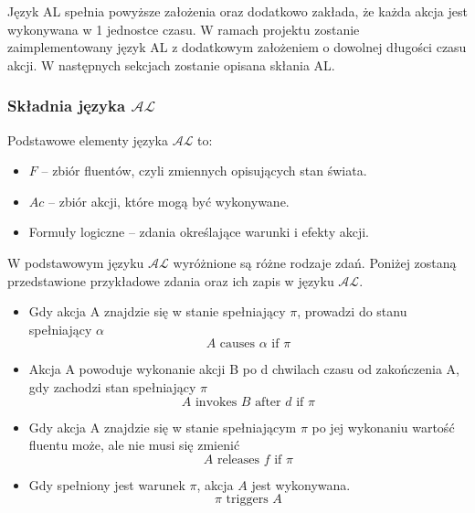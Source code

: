 \documentclass{article}
\begin{document}
Język AL spełnia powyższe założenia oraz dodatkowo zakłada, że każda akcja jest wykonywana w 1 jednostce czasu. W ramach projektu zostanie zaimplementowany język AL z dodatkowym założeniem o dowolnej długości czasu akcji. W następnych sekcjach zostanie opisana skłania AL.

\subsubsection{Składnia języka $\mathcal{AL}$}

Podstawowe elementy języka $\mathcal{AL}$ to:
\begin{itemize}
    \item $F$ – zbiór fluentów, czyli zmiennych opisujących stan świata.
    \item $Ac$ – zbiór akcji, które mogą być wykonywane.
    \item Formuły logiczne – zdania określające warunki i efekty akcji.
\end{itemize}

\noindent W podstawowym języku $\mathcal{AL}$ wyróżnione są różne rodzaje zdań. Poniżej zostaną przedstawione przykładowe zdania oraz ich zapis w języku $\mathcal{AL}$.
\begin{itemize}
    \item Gdy akcja A znajdzie się w stanie spełniający $\pi$, prowadzi do stanu spełniający $\alpha$
    \begin{equation}
     A \text{ causes } \alpha \text{ if } \pi
    \end{equation}

    \item Akcja A powoduje wykonanie akcji B po d chwilach czasu od zakończenia A, gdy zachodzi stan spełniający $\pi$
    \begin{equation}
        A \text{ invokes } B \text{ after } d \text{ if } \pi
    \end{equation}

    \item Gdy akcja A znajdzie się w stanie spełniającym $\pi$ po jej wykonaniu wartość fluentu może, ale nie musi się zmienić
    \begin{equation}
        A \text{ releases } f \text{ if } \pi
    \end{equation}

    \item Gdy spełniony jest warunek $\pi$, akcja $A$ jest wykonywana.
    \begin{equation}
        \pi \text{ triggers } A
    \end{equation}
\end{itemize}
\end{document}
